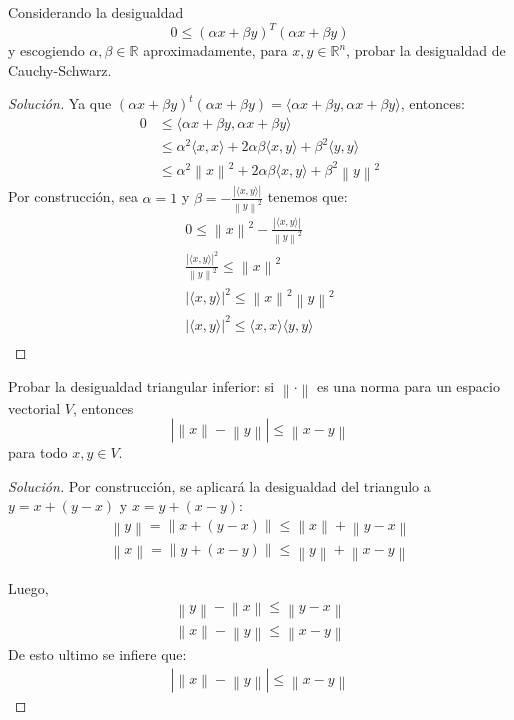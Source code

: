 \documentclass[12pt]{book}
\newcommand{\R}{\mathbb{R}}
\newcommand\norm[1]{\left\lVert#1\right\rVert}
\newcommand\abs[1]{\left\lvert#1\right\rvert}
\newenvironment{solucion}
  {\renewcommand\qedsymbol{$\square$}\begin{proof}[Solución]}
  {\end{proof}}
\begin{document}
\eje Considerando la desigualdad
\[
    0\leq(\alpha x+\beta y)^T(\alpha x+\beta y)
\]
y escogiendo $\alpha,\beta\in\R$ aproximadamente, para $x,y\in\R^n$, probar la desigualdad de Cauchy-Schwarz.
\newpage
\begin{solucion}
Ya que $(\alpha x+\beta y)^t(\alpha x+\beta y)=\langle\alpha x+\beta y,\alpha x+\beta y\rangle$, entonces:
\begin{align*}
    0&\leq\langle\alpha x+\beta y,\alpha x+\beta y\rangle\\
    &\leq\alpha^2\langle x,x\rangle+2\alpha\beta\langle x,y\rangle+\beta^2\langle y,y\rangle\\
    &\leq\alpha^2\norm{x}^2+2\alpha\beta\langle x,y\rangle+\beta^2\norm{y}^2
\end{align*}
Por construcción, sea $\alpha=1$ y $\beta=-\frac{|\langle x,y\rangle|}{\norm{y}^2}$ tenemos que:
\begin{align*}
    0\leq\norm{x}^2-\frac{|\langle x,y\rangle|}{\norm{y}^2}\\
    \frac{|\langle x,y\rangle|^2}{\norm{y}^2}\leq\norm{x}^2\\
    |\langle x,y\rangle|^2\leq\norm{x}^2 \norm{y}^2\\
    |\langle x,y\rangle|^2\leq\langle x,x\rangle \langle y,y\rangle\\
    \end{align*}
\end{solucion}

\eje Probar la desigualdad triangular inferior: si $\norm{\cdot}$ es una norma para un espacio vectorial $V$, entonces
\[\abs{\norm{x}-\norm{y}}\leq\norm{x-y}\]
para todo $x,y\in V$.
\begin{solucion}
Por construcción, se aplicará la desigualdad del triangulo a $y= x + (y-x)$ y $x= y + (x-y)$:\\
\begin{align*}
    \norm{y}=\norm{x+(y-x)}\leq \norm{x}+\norm{y-x}\\
    \norm{x}=\norm{y+(x-y)}\leq \norm{y}+\norm{x-y}
\end{align*}

Luego,
\begin{align*}
    \norm{y}-\norm{x}\leq \norm{y-x}\\
    \norm{x}-\norm{y}\leq \norm{x-y}
\end{align*}
De esto ultimo se infiere que:
\begin{align*}
    \abs{\norm{x}-\norm{y}}\leq \norm{x-y}
\end{align*}
\end{solucion}
\end{document}
